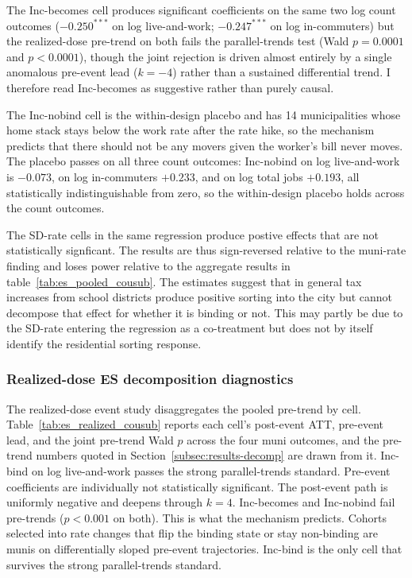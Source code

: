 \documentclass[12pt]{article}
\begin{document}
The Inc-becomes cell produces significant coefficients on the
same two log count outcomes ($-0.250^{***}$ on log live-and-work;
$-0.247^{***}$ on log in-commuters) but the realized-dose
pre-trend on both fails the parallel-trends test (Wald $p=0.0001$
and $p<0.0001$), though the joint rejection is driven almost
entirely by a single anomalous pre-event lead ($k=-4$) rather than
a sustained differential trend. I therefore read
Inc-becomes as suggestive rather than purely causal.

The Inc-nobind cell is the within-design placebo and has 14 municipalities
whose home stack stays below the work rate after
the rate hike, so the mechanism predicts that there should not be any movers given the worker's
bill never moves. The placebo passes on all three count outcomes: Inc-nobind on log live-and-work is $-0.073$,
on log in-commuters $+0.233$, and on log total jobs
$+0.193$, all statistically indistinguishable from
zero, so the within-design placebo holds across the count outcomes.

The SD-rate cells in the same regression produce postive effects that are not statistically signficant. The results
are thus sign-reversed relative to the muni-rate finding and loses power relative to the aggregate results in table~\ref{tab:es_pooled_cousub}. The estimates suggest that in general tax increases from school districts produce positive sorting into the city but cannot decompose that effect for whether it is binding or not. This may partly be due to the SD-rate entering the regression as a co-treatment
but does not by itself identify the residential sorting response.

\subsubsection{Realized-dose ES decomposition diagnostics}
\label{subsubsec:decomp-es}

The realized-dose event study disaggregates the pooled pre-trend
by cell. Table~\ref{tab:es_realized_cousub} reports each cell's
post-event ATT, pre-event lead, and the joint pre-trend Wald $p$
across the four muni outcomes, and the pre-trend numbers quoted in
Section~\ref{subsec:results-decomp} are drawn from it. Inc-bind on
log live-and-work passes the strong parallel-trends standard.
Pre-event coefficients are individually not statistically significant. The post-event path is
uniformly negative and deepens through $k=4$. Inc-becomes and Inc-nobind
fail pre-trends ($p<0.001$ on both). This is what the
mechanism predicts. Cohorts selected into rate changes
that flip the binding state or stay non-binding are munis on
differentially sloped pre-event trajectories. Inc-bind is the
only cell that survives the strong parallel-trends standard.
\end{document}
